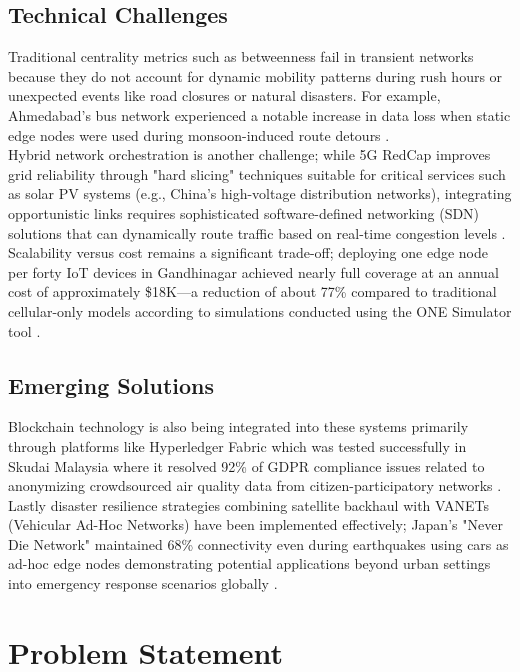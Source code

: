 \documentclass[10pt,a4paper]{report}
\begin{document}
\subsection{Technical Challenges}
Traditional centrality metrics such as betweenness fail in transient networks because
they do not account for dynamic mobility patterns during rush hours or unexpected
events like road closures or natural disasters. For example, Ahmedabad's bus network
experienced a notable increase in data loss when static edge nodes were used during
monsoon-induced route detours \cite{Gandhi_2023}.\\
Hybrid network orchestration is another challenge; while 5G RedCap improves grid
reliability through "hard slicing" techniques suitable for critical services such
as solar PV systems (e.g., China's high-voltage distribution networks), integrating
opportunistic links requires sophisticated software-defined networking (SDN)
solutions that can dynamically route traffic based on real-time congestion levels \cite{GSMA2024} \cite{Liu_2024}.\pagebreak \\
Scalability versus cost remains a significant trade-off; deploying one edge node
per forty IoT devices in Gandhinagar achieved nearly full coverage at an annual
cost of approximately \$18K—a reduction of about 77\% compared to traditional
cellular-only models according to simulations conducted using the ONE Simulator tool \cite{Gandhi_2023}.

\subsection{Emerging Solutions}
Blockchain technology is also being integrated into these systems primarily through
platforms like Hyperledger Fabric which was tested successfully in Skudai Malaysia
where it resolved 92\% of GDPR compliance issues related to anonymizing crowdsourced
air quality data from citizen-participatory networks \cite{Alasbali_2022}.\\
Lastly disaster resilience strategies combining satellite backhaul with VANETs
(Vehicular Ad-Hoc Networks) have been implemented effectively; Japan's "Never Die Network"
maintained 68\% connectivity even during earthquakes using cars as ad-hoc edge nodes
demonstrating potential applications beyond urban settings into emergency response
scenarios globally \cite{Andersson_2014}.

\section{Problem Statement}
\end{document}
